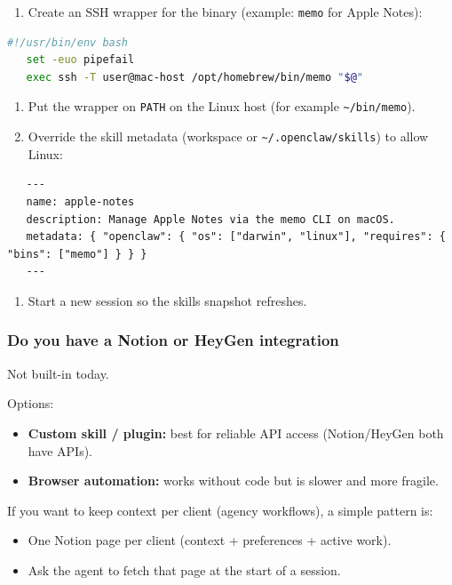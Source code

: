 \begin{enumerate}
  \item Create an SSH wrapper for the binary (example: \texttt{memo} for Apple Notes):
\end{enumerate}


\begin{lstlisting}[language=bash]
   #!/usr/bin/env bash
   set -euo pipefail
   exec ssh -T user@mac-host /opt/homebrew/bin/memo "$@"
\end{lstlisting}


\begin{enumerate}
  \item Put the wrapper on \texttt{PATH} on the Linux host (for example \texttt{\textasciitilde{}/bin/memo}).
  \item Override the skill metadata (workspace or \texttt{\textasciitilde{}/.openclaw/skills}) to allow Linux:
\end{enumerate}


\begin{lstlisting}
   ---
   name: apple-notes
   description: Manage Apple Notes via the memo CLI on macOS.
   metadata: { "openclaw": { "os": ["darwin", "linux"], "requires": { "bins": ["memo"] } } }
   ---
\end{lstlisting}


\begin{enumerate}
  \item Start a new session so the skills snapshot refreshes.
\end{enumerate}


\subsubsection{Do you have a Notion or HeyGen integration}


Not built-in today.

Options:

\begin{itemize}
  \item \textbf{Custom skill / plugin:} best for reliable API access (Notion/HeyGen both have APIs).
  \item \textbf{Browser automation:} works without code but is slower and more fragile.
\end{itemize}


If you want to keep context per client (agency workflows), a simple pattern is:

\begin{itemize}
  \item One Notion page per client (context + preferences + active work).
  \item Ask the agent to fetch that page at the start of a session.
\end{itemize}


